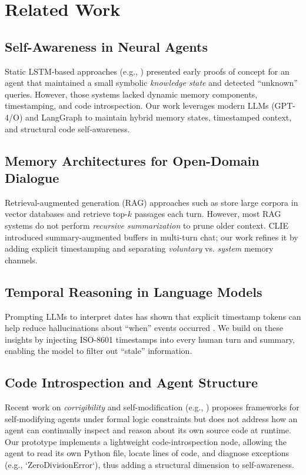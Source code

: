 \documentclass[11pt]{article}
\begin{document}
\section{Related Work}

\subsection{Self-Awareness in Neural Agents}
Static LSTM-based approaches (e.g., \cite{Mukai2020}) presented early proofs of concept for an agent that maintained a small symbolic \emph{knowledge state} and detected “unknown” queries. However, those systems lacked dynamic memory components, timestamping, and code introspection. Our work leverages modern LLMs (GPT-4/O) \cite{ChenGupta2024} and LangGraph to maintain hybrid memory states, timestamped context, and structural code self-awareness.

\subsection{Memory Architectures for Open-Domain Dialogue}
Retrieval-augmented generation (RAG) approaches such as \cite{Lewis2020} store large corpora in vector databases and retrieve top-$k$ passages each turn. However, most RAG systems do not perform \emph{recursive summarization} to prune older context. CLIE \cite{Sanh2022} introduced summary-augmented buffers in multi-turn chat; our work refines it by adding explicit timestamping and separating \emph{voluntary} vs. \emph{system} memory channels.

\subsection{Temporal Reasoning in Language Models}
Prompting LLMs to interpret dates has shown that explicit timestamp tokens can help reduce hallucinations about “when” events occurred \cite{Zhang2023}. We build on these insights by injecting ISO-8601 timestamps into every human turn and summary, enabling the model to filter out “stale” information.

\subsection{Code Introspection and Agent Structure}
Recent work on \emph{corrigibility} and self-modification (e.g., \cite{Soares2015}) proposes frameworks for self-modifying agents under formal logic constraints but does not address how an agent can continually inspect and reason about its own source code at runtime. Our prototype implements a lightweight code-introspection node, allowing the agent to read its own Python file, locate lines of code, and diagnose exceptions (e.g., `ZeroDivisionError`), thus adding a structural dimension to self-awareness.
\end{document}

